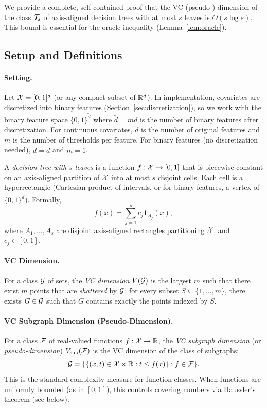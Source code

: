 \documentclass[12pt]{article}
\begin{document}
We provide a complete, self-contained proof that the VC (pseudo-) dimension of the class $\mathcal{T}_s$ of axis-aligned decision trees with at most $s$ leaves is $O(s \log s)$. This bound is essential for the oracle inequality (Lemma~\ref{lem:oracle}).

\subsection{Setup and Definitions}

\paragraph{Setting.}
Let $\mathcal{X} = [0,1]^d$ (or any compact subset of $\mathbb{R}^d$). In implementation, covariates are discretized into binary features (Section~\ref{sec:discretization}), so we work with the binary feature space $\{0,1\}^{\tilde{d}}$ where $\tilde{d} = md$ is the number of binary features after discretization. For continuous covariates, $d$ is the number of original features and $m$ is the number of thresholds per feature. For binary features (no discretization needed), $\tilde{d} = d$ and $m = 1$.

A \emph{decision tree with $s$ leaves} is a function $f: \mathcal{X} \to [0,1]$ that is piecewise constant on an axis-aligned partition of $\mathcal{X}$ into at most $s$ disjoint cells. Each cell is a hyperrectangle (Cartesian product of intervals, or for binary features, a vertex of $\{0,1\}^{\tilde{d}}$). Formally,
\[
f(x) = \sum_{j=1}^s c_j \mathbf{1}_{A_j}(x),
\]
where $A_1, \ldots, A_s$ are disjoint axis-aligned rectangles partitioning $\mathcal{X}$, and $c_j \in [0,1]$.

\paragraph{VC Dimension.}
For a class $\mathcal{G}$ of sets, the \emph{VC dimension} $V(\mathcal{G})$ is the largest $m$ such that there exist $m$ points that are \emph{shattered} by $\mathcal{G}$: for every subset $S \subseteq \{1,\ldots,m\}$, there exists $G \in \mathcal{G}$ such that $G$ contains exactly the points indexed by $S$.

\paragraph{VC Subgraph Dimension (Pseudo-Dimension).}
For a class $\mathcal{F}$ of real-valued functions $f: \mathcal{X} \to \mathbb{R}$, the \emph{VC subgraph dimension} (or \emph{pseudo-dimension}) $V_{\text{sub}}(\mathcal{F})$ is the VC dimension of the class of subgraphs:
\[
\mathcal{G} = \{ \{ (x,t) \in \mathcal{X} \times \mathbb{R} : t \le f(x) \} : f \in \mathcal{F} \}.
\]
This is the standard complexity measure for function classes. When functions are uniformly bounded (as in $[0,1]$), this controls covering numbers via Haussler's theorem (see below).
\end{document}
